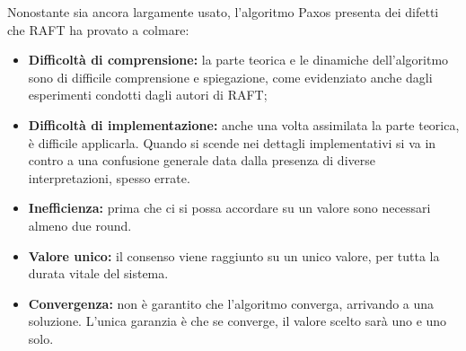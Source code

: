 Nonostante sia ancora largamente usato, l'algoritmo Paxos presenta dei difetti che RAFT ha provato a colmare:
\begin{itemize}
	\item \textbf{Difficoltà di comprensione:} la parte teorica e le dinamiche dell'algoritmo sono di difficile comprensione e spiegazione, come evidenziato anche dagli esperimenti condotti dagli autori di RAFT;
	
	\item \textbf{Difficoltà di implementazione:} anche una volta assimilata la parte teorica, è difficile applicarla. Quando si scende nei dettagli implementativi si va in contro a una confusione generale data dalla presenza di diverse interpretazioni, spesso errate.

	\item \textbf{Inefficienza:} prima che ci si possa accordare su un valore sono necessari almeno due round.

	\item \textbf{Valore unico:} il consenso viene raggiunto su un unico valore, per tutta la durata vitale del sistema.

	\item \textbf{Convergenza:} non è garantito che l'algoritmo converga, arrivando a una soluzione. L'unica garanzia è che se converge, il valore scelto sarà uno e uno solo.

\end{itemize}